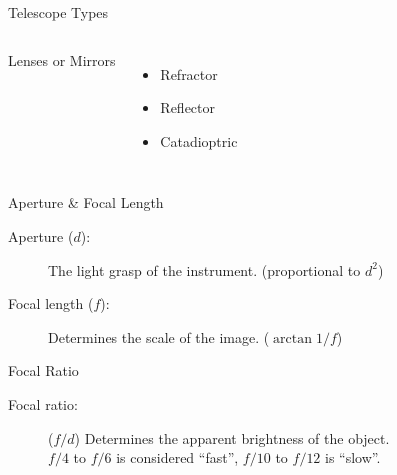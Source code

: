 
\begin{frame}{Telescope Types}
  \begin{columns}[T,onlytextwidth]

    \centering

      \Large Lenses or Mirrors\\[2ex]
      \begin{itemize}
        \item Refractor
        \item Reflector
        \item Catadioptric
      \end{itemize}

  \end{columns}
\end{frame}


\begin{frame}{Aperture \& Focal Length}
  \begin{description}
    \item[Aperture ($d$):] The light grasp of the instrument. (proportional to $d^2$)
    \item[Focal length ($f$):] Determines the scale of the image. ($\arctan{1/f}$)
    \end{description}

  \vfill
  
  \centering
\end{frame}


\begin{frame}{Focal Ratio}
  \begin{description}
    \item[Focal ratio:] ($f/d$) Determines the apparent brightness of the object. \\
    $f/4$ to $f/6$ is considered ``fast'', $f/10$ to $f/12$ is ``slow''.
    \end{description}
     
  \vfill

  \centering
\end{frame}

